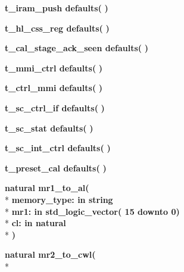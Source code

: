 \begin{DoxyCompactItemize}
\item 
{\bfseries {\bfseries \textcolor{vhdlchar}{t\+\_\+iram\+\_\+push}\textcolor{vhdlchar}{ }}} {\bf defaults}{\bfseries  ( }{\bfseries  )} 
\item 
{\bfseries {\bfseries \textcolor{vhdlchar}{t\+\_\+hl\+\_\+css\+\_\+reg}\textcolor{vhdlchar}{ }}} {\bf defaults}{\bfseries  ( }{\bfseries  )} 
\item 
{\bfseries {\bfseries \textcolor{vhdlchar}{t\+\_\+cal\+\_\+stage\+\_\+ack\+\_\+seen}\textcolor{vhdlchar}{ }}} {\bf defaults}{\bfseries  ( }{\bfseries  )} 
\item 
{\bfseries {\bfseries \textcolor{vhdlchar}{t\+\_\+mmi\+\_\+ctrl}\textcolor{vhdlchar}{ }}} {\bf defaults}{\bfseries  ( }{\bfseries  )} 
\item 
{\bfseries {\bfseries \textcolor{vhdlchar}{t\+\_\+ctrl\+\_\+mmi}\textcolor{vhdlchar}{ }}} {\bf defaults}{\bfseries  ( }{\bfseries  )} 
\item 
{\bfseries {\bfseries \textcolor{vhdlchar}{t\+\_\+sc\+\_\+ctrl\+\_\+if}\textcolor{vhdlchar}{ }}} {\bf defaults}{\bfseries  ( }{\bfseries  )} 
\item 
{\bfseries {\bfseries \textcolor{vhdlchar}{t\+\_\+sc\+\_\+stat}\textcolor{vhdlchar}{ }}} {\bf defaults}{\bfseries  ( }{\bfseries  )} 
\item 
{\bfseries {\bfseries \textcolor{vhdlchar}{t\+\_\+sc\+\_\+int\+\_\+ctrl}\textcolor{vhdlchar}{ }}} {\bf defaults}{\bfseries  ( }{\bfseries  )} 
\item 
{\bfseries {\bfseries \textcolor{vhdlchar}{t\+\_\+preset\+\_\+cal}\textcolor{vhdlchar}{ }}} {\bf defaults}{\bfseries  ( }{\bfseries  )} 
\item 
{\bfseries {\bfseries \textcolor{comment}{natural}\textcolor{vhdlchar}{ }}} {\bf mr1\+\_\+to\+\_\+al}{\bfseries  ( }\\*
{\bfseries \textcolor{vhdlchar}{memory\+\_\+type\+: }\textcolor{stringliteral}{in }{\bfseries \textcolor{comment}{string}\textcolor{vhdlchar}{ }}}\\*
{\bfseries \textcolor{vhdlchar}{mr1\+: }\textcolor{stringliteral}{in }\textcolor{vhdlchar}{std\+\_\+logic\+\_\+vector( 15 downto  0)}}\\*
{\bfseries \textcolor{vhdlchar}{cl\+: }\textcolor{stringliteral}{in }{\bfseries \textcolor{comment}{natural}\textcolor{vhdlchar}{ }}}\\*
{\bfseries  )} 
\item 
{\bfseries {\bfseries \textcolor{comment}{natural}\textcolor{vhdlchar}{ }}} {\bf mr2\+\_\+to\+\_\+cwl}{\bfseries  ( }\\*

\end{DoxyCompactItemize}
